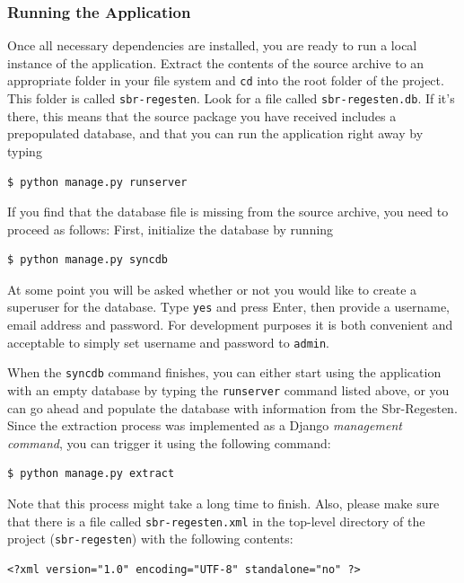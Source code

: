\subsubsection{Running the Application}
\label{sec:run}

Once all necessary dependencies are installed, you are ready to run a
local instance of the application. Extract the contents of the source
archive to an appropriate folder in your file system and \texttt{cd}
into the root folder of the project. This folder is called
\texttt{sbr-regesten}. Look for a file called
\texttt{sbr-regesten.db}. If it's there, this means that the source
package you have received includes a prepopulated database, and that
you can run the application right away by typing

\begin{verbatim}
$ python manage.py runserver
\end{verbatim}

If you find that the database file is missing from the source archive,
you need to proceed as follows: First, initialize the database by running

\begin{verbatim}
$ python manage.py syncdb
\end{verbatim}

At some point you will be asked whether or not you would like to
create a superuser for the database. Type \texttt{yes} and press
Enter, then provide a username, email address and password. For
development purposes it is both convenient and acceptable to simply
set username and password to \texttt{admin}.

When the \texttt{syncdb} command finishes, you can either start using
the application with an empty database by typing the
\texttt{runserver} command listed above, or you can go ahead and
populate the database with information from the Sbr-Regesten. Since
the extraction process was implemented as a Django \emph{management command},
you can trigger it using the following command:

\begin{verbatim}
$ python manage.py extract
\end{verbatim}

Note that this process might take a long time to finish. Also, please
make sure that there is a file called \texttt{sbr-regesten.xml} in the
top-level directory of the project (\texttt{sbr-regesten}) with the
following contents:

\begin{verbatim}
<?xml version="1.0" encoding="UTF-8" standalone="no" ?>

\end{verbatim}

